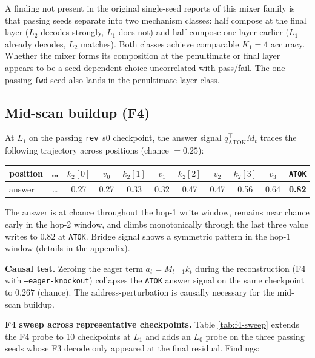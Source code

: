 \documentclass[11pt]{article}
\newcommand{\claim}[1]{#1}
\begin{document}
A finding not present in the original single-seed reports of this
mixer family is that passing seeds separate into two mechanism
classes: half compose at the final layer ($L_2$ decodes strongly,
$L_1$ does not) and half compose one layer earlier ($L_1$ already
decodes, $L_2$ matches). Both classes achieve comparable
$K_1{=}4$ accuracy. Whether the mixer forms its composition at the
penultimate or final layer appears to be a seed-dependent choice
uncorrelated with pass/fail. The one passing \texttt{fwd} seed also
lands in the penultimate-layer class.

\subsection{Mid-scan buildup (F4)}
\label{sec:results:midscan}

At $L_1$ on the passing \texttt{rev}~s0 checkpoint, the answer signal
$q_{\text{ATOK}}^{\top} M_t$ traces the following trajectory across
positions (chance $= 0.25$):

\begin{center}
\begin{tabular}{lcccccccccc}
\toprule
position & \dots & $k_2[0]$ & $v_0$ & $k_2[1]$ & $v_1$ & $k_2[2]$ & $v_2$ & $k_2[3]$ & $v_3$ & \texttt{ATOK} \\
\midrule
answer   & \dots & 0.27     & 0.27  & 0.33     & 0.32  & 0.47     & 0.47  & 0.56     & 0.64  & \textbf{0.82} \\
\bottomrule
\end{tabular}
\end{center}

The answer is at chance throughout the hop-1 write window, remains near
chance early in the hop-2 window, and climbs monotonically through the
last three value writes to $0.82$ at \texttt{ATOK}. Bridge signal shows
a symmetric pattern in the hop-1 window (details in the appendix).

\textbf{Causal test.} Zeroing the eager term $a_t = M_{t-1} k_t$ during
the reconstruction (F4 with \texttt{--eager-knockout}) collapses the
\texttt{ATOK} answer signal on the same checkpoint to
\claim{$0.267$ (chance)}. The address-perturbation is causally
necessary for the mid-scan buildup.

\textbf{F4 sweep across representative checkpoints.} Table
\ref{tab:f4-sweep} extends the F4 probe to 10 checkpoints at $L_1$ and
adds an $L_0$ probe on the three passing seeds whose F3 decode only
appeared at the final residual. Findings:
\end{document}
